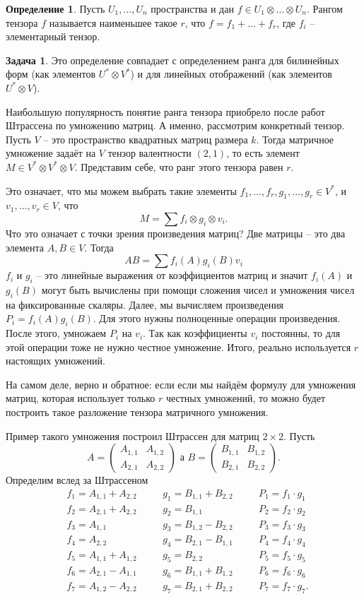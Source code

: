 \documentclass[10pt,a4paper,oneside]{book}
\theoremstyle{definition}
\newtheorem{zad}{\color{violet!100!black}Задача}
\newtheorem*{defn}{\color{yellow!30!red} Определение}
\def\dfn{\begin{defn}}
\def\edfn{\end{defn}}
\def\zd{\begin{zad}}
\def\ezd{\end{zad}}
\def\pmat{\begin{pmatrix}}
\def\epmat{\end{pmatrix}}
\begin{document}
\dfn Пусть $U_1,\dots, U_n$ пространства и дан $f\in U_1 \otimes \dots \otimes U_n$. Рангом тензора $f$ называется наименьшее такое $r$, что $f=f_1+\dots+f_r$, где $f_i$ -- элементарный тензор.
\edfn

\zd Это определение совпадает с определением ранга для билинейных форм (как элементов $U^*\otimes V^*$) и для линейных отображений (как элементов $U^* \otimes V$).
\ezd

Наибольшую популярность понятие ранга тензора приобрело после работ Штрассена по умножению матриц. А именно, рассмотрим конкретный тензор. Пусть $V$ -- это пространство квадратных матриц размера $k$. Тогда матричное умножение задаёт на $V$ тензор валентности $(2,1)$, то есть элемент $M\in V^*\otimes V^* \otimes V$. Представим себе, что ранг этого тензора равен $r$.

Это означает, что мы можем выбрать такие элементы $f_1,\dots,f_r, g_1, \dots, g_r \in V^*$, и $v_1,\dots,v_r \in V$, что
$$M= \sum f_i\otimes g_i \otimes v_i.$$
Что это означает с точки зрения произведения матриц? Две матрицы -- это два элемента $A,B \in V$. Тогда 
$$AB=\sum f_i(A)g_i(B)v_i$$
$f_i$ и $g_i$ -- это линейные выражения от коэффициентов матриц и значит  $f_i(A)$ и $g_i(B)$ могут быть вычислены при помощи сложения чисел и умножения чисел на фиксированные скаляры. Далее, мы вычисляем произведения $P_i=f_i(A)g_i(B)$. Для этого нужны полноценные операции произведения. После этого, умножаем $P_i$ на $v_i$. Так как коэффициенты $v_i$ постоянны, то для этой операции тоже не нужно честное умножение. Итого, реально используется $r$ настоящих умножений. 

На самом деле, верно и обратное: если если мы найдём формулу для умножения матриц, которая использует только $r$ честных умножений, то можно будет построить такое разложение тензора матричного умножения. 

Пример такого умножения построил Штрассен для матриц $2\times 2$. Пусть 
$$A=\pmat A_{1,1} & A_{1,2} \\ A_{2,1} & A_{2,2} \epmat \text{ а } B=\pmat B_{1,1} & B_{1,2} \\ B_{2,1} & B_{2,2} \epmat.$$
Определим вслед за Штрассеном
$$
\begin{aligned}
&f_1=A_{1,1}+ A_{2,2} &\quad & g_1= B_{1,1}+B_{2,2} &\quad & P_1=f_1\cdot g_1\\
&f_2=A_{2,1}+A_{2,2} &\quad & g_2=B_{1,1}&\quad & P_2=f_2\cdot g_2\\
&f_3=A_{1,1}&\quad & g_3=B_{1,2}-B_{2,2}  &\quad & P_3=f_3\cdot g_3\\
&f_4=A_{2,2}&\quad & g_4=B_{2,1}-B_{1,1} &\quad & P_4=f_4\cdot g_4\\
&f_5=A_{1,1}+A_{1,2}&\quad & g_5=B_{2,2} &\quad & P_5=f_5\cdot g_5\\
&f_6=A_{2,1}-A_{1,1}&\quad & g_6=B_{1,1}+B_{1,2} &\quad & P_6=f_6\cdot g_6\\
&f_7=A_{1,2}-A_{2,2}&\quad & g_7=B_{2,1}+B_{2,2} &\quad & P_7=f_7\cdot g_7.
\end{aligned}
$$
\end{document}
